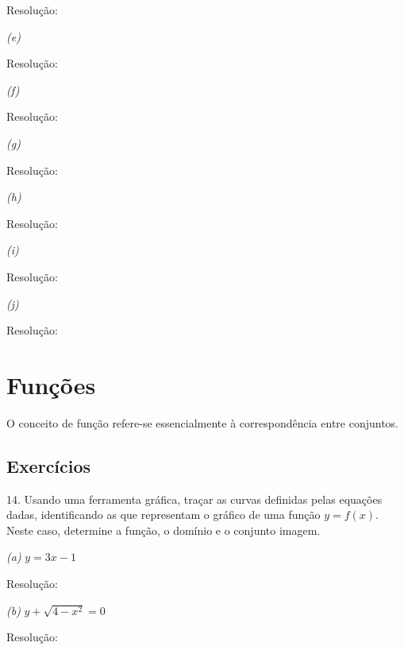 \documentclass[12 pt, openright, twoside, a4paper, english, french, spanish, brazil]{abntex2}
\begin{document}
Resolução:
\bigskip


\textit{(e)}

Resolução:
\bigskip


\textit{(f)}

Resolução:
\bigskip


\textit{(g)}

Resolução:
\bigskip


\textit{(h)}

Resolução:
\bigskip


\textit{(i)}

Resolução:
\bigskip


\textit{(j)}

Resolução:
\bigskip


\section{Funções}

O conceito de função refere-se essencialmente à correspondência entre conjuntos. 

\subsection{Exercícios}

14. Usando uma ferramenta gráfica, traçar as curvas definidas pelas equações dadas, identificando as que representam o gráfico de uma função $y = f(x)$. Neste caso, determine a função, o domínio e o conjunto imagem. 

\textit{(a)} $y = 3x - 1$

Resolução:

\bigskip


\textit{(b)} $y + \sqrt{4 - x^2} = 0$

Resolução:

\bigskip
\end{document}
